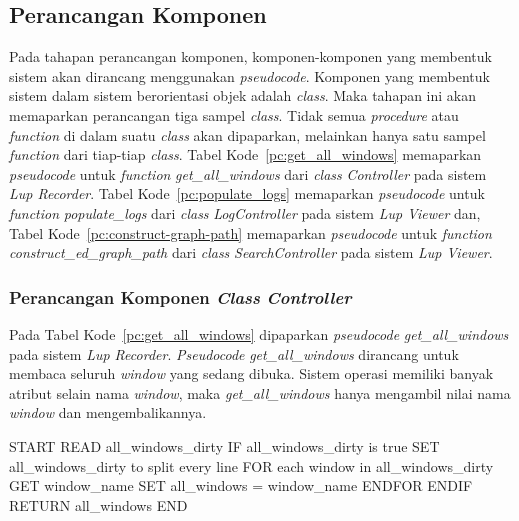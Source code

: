 \subsection{Perancangan Komponen}

Pada tahapan perancangan komponen, komponen-komponen yang membentuk
sistem akan dirancang menggunakan \emph{pseudocode}. Komponen yang
membentuk sistem dalam sistem berorientasi objek adalah \emph{class}. Maka
tahapan ini akan memaparkan perancangan tiga sampel \emph{class}. Tidak semua
\emph{procedure} atau \emph{function} di dalam suatu \emph{class} akan
dipaparkan, melainkan hanya satu sampel \emph{function} dari tiap-tiap
\emph{class}. Tabel Kode~\ref{pc:get_all_windows} memaparkan \emph{pseudocode} untuk \emph{function}
\emph{get\_all\_windows} dari \emph{class} \emph{Controller} pada sistem \emph{Lup
  Recorder}. Tabel Kode~\ref{pc:populate_logs} memaparkan \emph{pseudocode} untuk
\emph{function} \emph{populate\_logs} dari \emph{class} \emph{LogController} pada
sistem \emph{Lup Viewer} dan, Tabel Kode~\ref{pc:construct-graph-path} memaparkan
\emph{pseudocode} untuk \emph{function} \emph{construct\_ed\_graph\_path}
dari \emph{class} \emph{SearchController} pada sistem \emph{Lup Viewer}.

\subsubsection{Perancangan Komponen \emph{Class} \emph{Controller}}

Pada Tabel Kode~\ref{pc:get_all_windows} dipaparkan \emph{pseudocode}
\emph{get\_all\_windows} pada sistem \emph{Lup
  Recorder}. \emph{Pseudocode} \emph{get\_all\_windows} dirancang
untuk membaca seluruh \emph{window} yang sedang dibuka. Sistem operasi
memiliki banyak atribut selain nama \emph{window}, maka
\emph{get\_all\_windows} hanya mengambil nilai nama \emph{window} dan
mengembalikannya.

\par\null\par
\begin{code}
\begin{ignasicblock}[title=get\_all\_windows,minted language=text]
START
  READ all_windows_dirty
  IF all_windows_dirty is true
    SET all_windows_dirty to split every line
    FOR each window in all_windows_dirty
      GET window_name
      SET all_windows = window_name
    ENDFOR
  ENDIF
  RETURN all_windows
END
\end{ignasicblock}
    \label{pc:get_all_windows}
\end{code}

